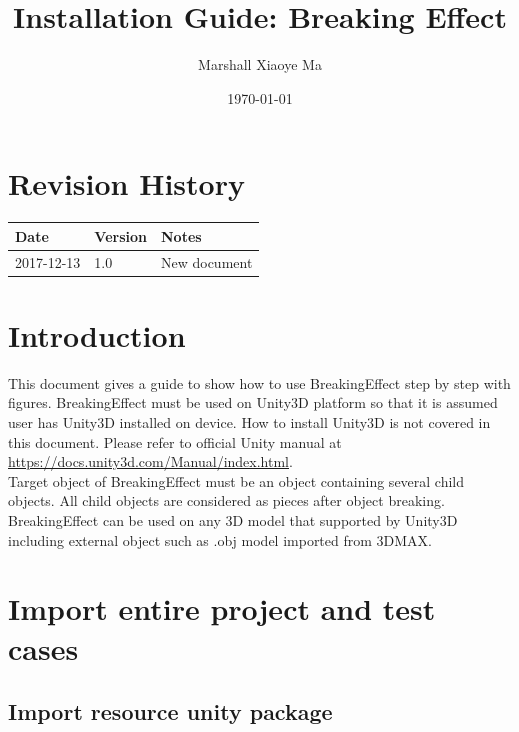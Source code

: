 \documentclass[12pt, titlepage]{article}
\begin{document}
	
	\title{Installation Guide: Breaking Effect} 
	\author{Marshall Xiaoye Ma}
	\date{\today}
	
	\maketitle
	
	
	\section{Revision History}
	
	\begin{tabularx}{\textwidth}{p{3cm}p{2cm}X}
		\toprule {\bf Date} & {\bf Version} & {\bf Notes}\\
		\midrule
		2017-12-13 & 1.0 & New document\\
		\bottomrule
	\end{tabularx}
	
	\newpage
	
	\tableofcontents
	
	\listoftables
	
	\listoffigures
	
	\newpage
	
	
	\section{Introduction}
	This document gives a guide to show how to use BreakingEffect step by step with figures. BreakingEffect must be used on Unity3D platform so that it is assumed user has Unity3D installed on device. How to install Unity3D is not covered in this document. Please refer to official Unity manual at \url{https://docs.unity3d.com/Manual/index.html}. \\
	
	Target object of BreakingEffect must be an object containing several child objects. All child objects are considered as pieces after object breaking. BreakingEffect can be used on any 3D model that supported by Unity3D including external object such as .obj model imported from 3DMAX.
	\section{Import entire project and test cases} \label{SecProject}	
	
	\subsection{Import resource unity package}
	
\end{document}
